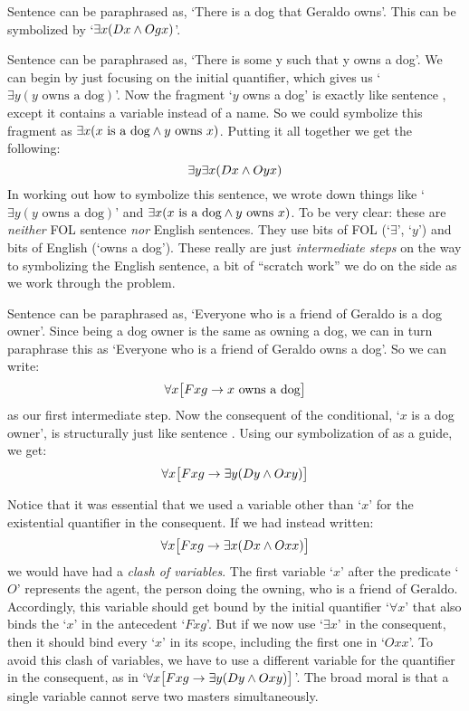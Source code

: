 Sentence  can be paraphrased as, `There is a dog that Geraldo owns'. This can be symbolized by `$\exists x(Dx \wedge Ogx)$'.

Sentence  can be paraphrased as, `There is some y such that y owns a dog'.   We can begin by just focusing on the initial quantifier, which gives us `$\exists y(y\text{ owns a dog})$'. Now the fragment `$y$ owns a dog' is exactly like sentence , except it contains a variable instead of a name.  So we could symbolize this fragment as $\exists x(x \text{ is a dog} \wedge y \text{ owns } x)$. Putting it all together we get the following:
$$\exists y \exists x(Dx \wedge Oyx)$$
In working out how to symbolize this sentence, we wrote down things like `$\exists y(y\text{ owns a dog})$' and $\exists x(x \text{ is a dog} \wedge y \text{ owns } x)$. To be very clear: these are \emph{neither} FOL sentence \emph{nor} English sentences.  They use bits of FOL (`$\exists$', `$y$') and bits of English (`owns a dog'). These really are just \emph{intermediate steps} on the way to symbolizing the English sentence, a bit of ``scratch work'' we do on the side as we work through the problem.

Sentence  can be paraphrased as, `Everyone who is a friend of Geraldo is a dog owner'.  Since being a dog owner is the same as owning a dog, we can in turn paraphrase this as `Everyone who is a friend of Geraldo owns a dog'. So we can write:
$$\forall x \bigl[Fxg \rightarrow x \text{ owns a dog}\bigr]$$
as our first intermediate step.  Now the consequent of the conditional, `$x$ is a dog owner', is structurally just like sentence . Using our symbolization of  as a guide, we get:
$$\forall x \bigl[Fxg \rightarrow \exists y(Dy \wedge Oxy)\bigr]$$

Notice that it was essential that we used a variable other than `$x$' for the existential quantifier in the consequent.  If we had instead written:
$$\forall x \bigl[Fxg \rightarrow \exists x(Dx \wedge Oxx)\bigr]$$
we would have had a \emph{clash of variables}. The first variable `$x$' after the predicate `$O$' represents the agent, the person doing the owning, who is a friend of Geraldo.  Accordingly, this variable should get bound by the initial quantifier `$\forall x$' that  also binds the `$x$' in the antecedent `$Fxg$'.  But if we now use `$\exists x$' in the consequent, then it should bind every `$x$' in its scope, including the first one in `$Oxx$'. To avoid this clash of variables, we have to use a different variable for the quantifier in the consequent, as in `$\forall x \bigl[Fxg \rightarrow \exists y(Dy \wedge Oxy)\bigr]$'.   The broad moral is that a single variable cannot serve two masters simultaneously.


